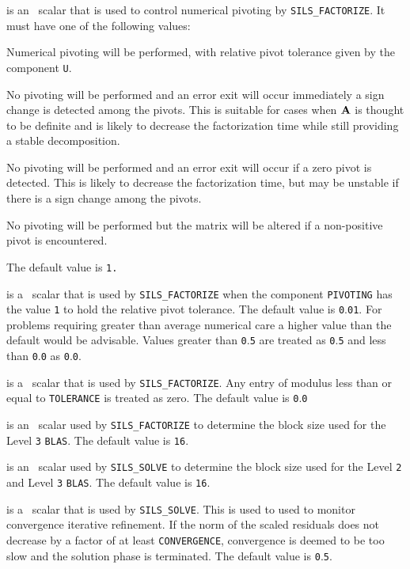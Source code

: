 \documentclass{galahad}
\newcommand{\packagename}{SILS}
\begin{document}
\begin{description}
 is an \integer\ scalar that is used to control numerical
pivoting by {\tt \packagename\_FACTORIZE}. It must have one of the
following values:

\begin{description}
  Numerical pivoting will be performed, with relative pivot
tolerance given by the component {\tt U}.

  No pivoting will be performed and an error exit will occur
immediately a sign change is detected among the pivots. This is
suitable for cases when ${\mathbf{A}}$  is thought to be definite and is likely to
decrease the factorization time while still providing a stable
decomposition.

  No pivoting will be performed and an error exit will occur if a
zero pivot is detected. This is likely to decrease the factorization
time, but may be unstable if there is a sign change among the pivots.

  No pivoting will be performed but the matrix will be altered
if a non-positive pivot is encountered.

\end{description}

\noindent The default value is {\tt 1.}

 is a \realdp\ scalar that is used by {\tt \packagename\_FACTORIZE}
when the
component {\tt PIVOTING} has the value {\tt 1} to hold the relative pivot
tolerance.  The default value is {\tt 0}.{\tt 01}.  For problems requiring
greater
than average numerical care a higher value than the default would be
advisable. Values greater than {\tt 0}.{\tt 5} are treated as {\tt 0}.{\tt 5}
and less than {\tt 0}.{\tt 0} as {\tt 0}.{\tt 0}.

 is a \realdp\ scalar that is used by
{\tt \packagename\_FACTORIZE}.
Any entry of modulus less than or equal to {\tt TOLERANCE} is treated as zero.
The default value is {\tt 0}.{\tt 0}

 is an \integer\ scalar used by
{\tt \packagename\_FACTORIZE}
to determine
the block size used for the Level {\tt 3} {\tt BLAS}.  The default value
is {\tt 16}.

 is an \integer\ scalar used by {\tt \packagename\_SOLVE}
to determine the block size used for the Level {\tt 2} and Level {\tt 3}
{\tt BLAS}.  The default value is {\tt 16}.

 is a \realdp\ scalar that is used by
{\tt \packagename\_SOLVE}.  This is used to used to monitor convergence
iterative refinement. If the norm of
the scaled residuals does not decrease by a factor of at least
{\tt CONVERGENCE}, convergence is deemed to be too slow and the
solution phase is terminated.
The default value is {\tt 0}.{\tt 5}.


\end{description}
\end{document}
